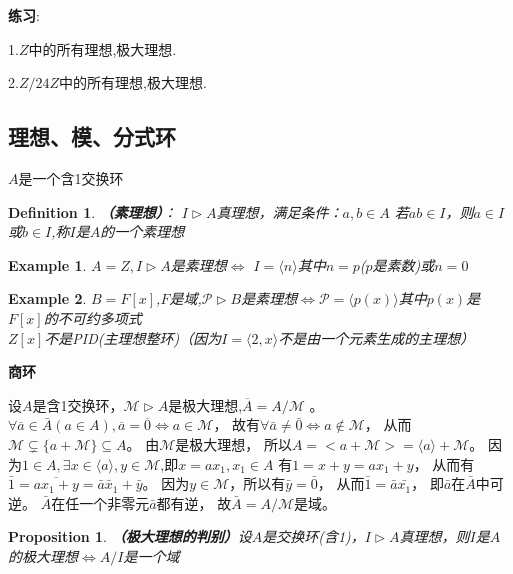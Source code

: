 \documentclass[UTF8]{article}
\newtheorem{defn}{Definition}[section]
\newtheorem{prop}{Proposition}[section]
\newtheorem{exa}{Example}[section]
\begin{document}
\textbf{练习}:

1.$Z$中的所有理想,极大理想.

2.$Z/24Z$中的所有理想,极大理想.





\subsection{理想、模、分式环}
$A$是一个含1交换环
\begin{defn}
	\textbf{（素理想）}：
	$I\vartriangleright A$真理想，满足条件：$a,b\in A$
	若$ab\in I$，则$a\in I$或$b\in I$,称$I$是$A$的一个素理想
\end{defn}

\begin{exa}
	$A=Z,I\vartriangleright A$是素理想$ \Longleftrightarrow $ $I=\langle n\rangle$其中$n=p$($p$是素数)或$n=0$
\end{exa}

\begin{exa}
	$B=F[x]$,$F$是域,$\mathcal P\vartriangleright B$是素理想$ \Longleftrightarrow\mathcal P=\langle p(x)\rangle$其中$p(x)$是$F[x]$的不可约多项式\\
	$Z[x]$不是PID(主理想整环)（因为$I=\langle 2,x\rangle$不是由一个元素生成的主理想）
\end{exa}

\textbf{商环}\\
\par 设$A$是含1交换环，$\mathcal M\vartriangleright A$是极大理想,$\overline A =A/\mathcal M$ 。%
$\forall \overline a\in\bar A(a\in A),\overline a=\overline 0\Longleftrightarrow a\in\mathcal M$，
故有$\forall\bar a\ne\bar 0\Longleftrightarrow a\notin\mathcal M$，
从而$\mathcal M\subsetneq\{a+\mathcal M\}\subseteq A$。
由$\mathcal M$是极大理想，
所以$A=<a+\mathcal M>=\langle a\rangle+\mathcal M$。
因为$1\in A, \exists x\in\langle a\rangle,y\in\mathcal M$,即$x=ax_1,x_1\in A$
有$1=x+y=ax_1+y$，
从而有$\bar1=\overline{ax_1+y}=\bar a\bar x_1+\bar y$。
因为$y\in\mathcal M$，所以有$\bar y=\bar 0$，
从而$\bar1=\bar a\bar {x_1}$，
即$\bar a$在$\bar A$中可逆。
$\bar A$在任一个非零元$\bar a$都有逆，
故$\bar A=A/\mathcal M$是域。

\begin{prop}
	\textbf{（极大理想的判别）}设$A$是交换环(含1)，$I\vartriangleright A$真理想，则$I$是$A$的极大理想$\Longleftrightarrow A/I$是一个域
\end{prop}
\end{document}
